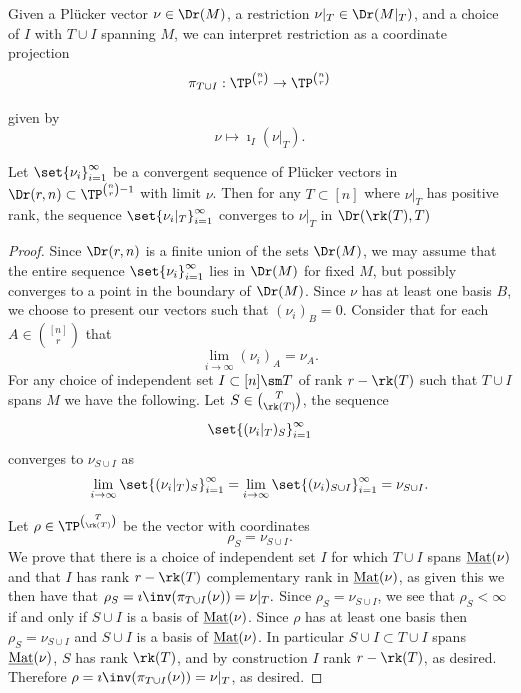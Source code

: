  Given a Pl\"ucker vector $\nu\in \Dr(M)$, a restriction $\nu|_T\in \Dr(M|_{T})$, and a choice of $I$ with $T\cup I$ spanning $M$, we can interpret restriction as a coordinate projection 
 $$\pi_{T\cup I}: \TP^{\binom{n}{r}}\to \TP^{\binom{n}{r}}$$
 
 given by
$$\nu\mapsto \imath_I(\nu|_T).$$


\begin{proposition}\label{prop:plConvergence}
Let $\set{\nu_i}_{i=1}^\infty$ be a convergent sequence of Pl\"ucker vectors in $\Dr(r,n)\subset \TP^{\binom{n}{r}-1}$ with limit $\nu$. Then for any $T\subset [n]$ where $\nu|_T$ has positive rank, the sequence $\set{\nu_i|_T}_{i=1}^\infty$ converges to $\nu|_T$ in $\Dr(\rk(T), T)$
\end{proposition}
\begin{proof}
 Since $\Dr(r,n)$ is a finite union of the sets $\Dr(M)$, we may assume that the entire sequence $\set{\nu_i}_{i=1}^\infty$ lies in $\Dr(M)$ for fixed $M$, but possibly converges to a point in the boundary of $\Dr(M)$.  Since $\nu$ has at least one basis $B$, we choose to present our vectors such that $(\nu_i)_B = 0$. 
 Consider that for each $A\in \binom{[n]}{r}$ that 
 $$\lim_{i\to \infty} (\nu_i)_A = \nu_A.$$
 For any choice of independent set $I\subset [n]\sm T$ of rank $r-\rk(T)$ such that $T\cup I$ spans $M$ we have the following. Let $S\in \binom{T}{\rk(T)}$, the sequence
 $$\set{(\nu_i|_{T})_S}_{i=1}^\infty$$ 
 converges to $\nu_{S\cup I}$ as
 $$\lim_{i\to\infty}\set{(\nu_i|_{T})_S}_{i=1}^\infty=\lim_{i\to\infty}\set{(\nu_i)_{S\cup I}}_{i=1}^\infty=\nu_{S\cup I}.$$
 
Let $\rho\in \TP^{\binom{T}{\rk(T)}}$ be the vector with coordinates 
$$\rho_S = \nu_{S\cup I}.$$
We prove that there is a choice of independent set $I$ for which $T\cup I$ spans $\operatorname{\underline{Mat}}(\nu)$ and that $I$ has rank $r-\rk(T)$ complementary rank in $\operatorname{\underline{Mat}}(\nu)$, as given this we then have that $\rho_S = \imath\inv(\pi_{T\cup I}(\nu))= \nu|_T.$ Since $\rho_S = \nu_{S\cup I}$, we see that $\rho_S<\infty$ if and only if $S\cup I$ is a basis of $\operatorname{\underline{Mat}}(\nu)$. Since $\rho$ has at least one basis then $\rho_S = \nu_{S\cup I}$ and $S\cup I$ is a basis of $\operatorname{\underline{Mat}}(\nu)$. In particular $S\cup I\subset T\cup I$ spans $\operatorname{\underline{Mat}}(\nu)$, $S$ has rank $\rk(T)$, and by construction $I$ rank $r-\rk(T)$, as desired. Therefore $\rho = \imath\inv(\pi_{T\cup I}(\nu)) = \nu|_T$, as desired.
\end{proof}



